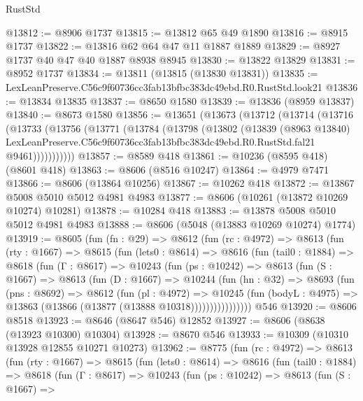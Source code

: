 \begin{lexlean}{RustStd}
\begin{coremodule}
@13812 := @8906 @1737
@13815 := @13812 @65 @49 @1890
@13816 := @8915 @1737
@13822 := @13816 @62 @64 @47 @11 @1887 @1889
@13829 := @8927 @1737 @40 @47 @40 @1887 @8938 @8945
@13830 := @13822 @13829
@13831 := @8952 @1737
@13834 := @13811 (@13815 (@13830 @13831))
@13835 := LexLeanPreserve.C56c9f60736cc3fab13bfbc383dc49ebd.R0.RustStd.look21
@13836 := @13834 @13835
@13837 := @8650 @1580
@13839 := @13836 (@8959 @13837)
@13840 := @8673 @1580
@13856 := @13651
    (@13673
      (@13712
        (@13714
          (@13716
            (@13733
              (@13756
                (@13771
                  (@13784
                    (@13798
                      (@13802
                        (@13839
                          (@8963 @13840)
                          LexLeanPreserve.C56c9f60736cc3fab13bfbc383dc49ebd.R0.RustStd.fal21
                          @9461)))))))))))
@13857 := @8589 @418
@13861 := @10236 (@8595 @418) (@8601 @418)
@13863 := @8606 (@8516 @10247)
@13864 := @4979 @7471
@13866 := @8606 (@13864 @10256)
@13867 := @10262 @418
@13872 := @13867 @5008 @5010 @5012 @4981 @4983
@13877 := @8606 (@10261 (@13872 @10269 @10274) @10281)
@13878 := @10284 @418
@13883 := @13878 @5008 @5010 @5012 @4981 @4983
@13888 := @8606 (@5048 (@13883 @10269 @10274) @1774)
@13919 := @8605
    (fun (fn : @29) =>
    @8612
      (fun (rc : @4972) =>
      @8613
        (fun (rty : @1667) =>
        @8615
          (fun (lets0 : @8614) =>
          @8616
            (fun (tail0 : @1884) =>
            @8618
              (fun (Γ : @8617) =>
              @10243
                (fun (ps : @10242) =>
                @8613
                  (fun (S : @1667) =>
                  @8613
                    (fun (D : @1667) =>
                    @10244
                      (fun (hn : @32) =>
                      @8693
                        (fun (pns : @8692) =>
                        @8612
                          (fun (pl : @4972) =>
                          @10245
                            (fun (bodyL : @4975) =>
                            @13863 (@13866 (@13877 (@13888 @10318))))))))))))))))
    @546
@13920 := @8606 @8518
@13923 := @8646 (@8647 @546) @12852
@13927 := @8606 (@8638 (@13923 @10300) @10304)
@13928 := @8670 @546
@13933 := @10309 (@10310 @13928 @12855 @10271 @10273)
@13962 := @8775
    (fun (rc : @4972) =>
    @8613
      (fun (rty : @1667) =>
      @8615
        (fun (lets0 : @8614) =>
        @8616
          (fun (tail0 : @1884) =>
          @8618
            (fun (Γ : @8617) =>
            @10243
              (fun (ps : @10242) =>
              @8613
                (fun (S : @1667) =>

\end{coremodule}
\end{lexlean}
